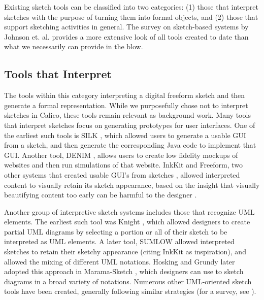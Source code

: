 Existing sketch tools can be classified into two categories: (1) those that interpret sketches with the purpose of turning them into formal objects, and (2) those that support sketching activities in general. The survey on sketch-based systems by Johnson et. al. \citep{Johnson} provides a more extensive look of all tools created to date than what we necessarily can provide in the blow.

\subsection {Tools that Interpret}
\label{relatedwork:1}

The  tools within this category interpreting a digital freeform sketch and then generate a formal representation. While we purposefully chose not to interpret sketches in Calico, these tools remain relevant as background work.
Many tools that interpret sketches focus on generating prototypes for user interfaces. One of the earliest  such tools is SILK \citep{Landay}, which allowed users to generate a usable GUI from a sketch, and then generate the corresponding Java code to implement that GUI. Another tool, DENIM \citep{Newman}, allows users to create low fidelity mockups of websites and then run simulations of that website.  InkKit and Freeform, two other systems that created usable GUI's from sketches \citep{Chung,Plimmer}, allowed interpreted content to visually retain its sketch appearance, based on the insight that visually beautifying content too early can be harmful to the designer \citep{Shipman}. 

Another group of interpretive sketch systems includes those that recognize UML elements. The earliest such tool was Knight \citep{Damma}, which allowed  designers to create partial UML diagrams by selecting a portion or all of their sketch to be interpreted as UML elements. A later tool, SUMLOW \citep{Chen} allowed interpreted sketches to retain their sketchy appearance (citing InkKit as inspiration), and allowed the mixing of different UML notations. Hosking and Grundy later adopted this approach in Marama-Sketch \citep{Grundy}, which designers can use to sketch diagrams in a broad variety of notations. Numerous other UML-oriented sketch tools have been created, generally following similar strategies (for a survey, see \citep{Johnson} ). 

